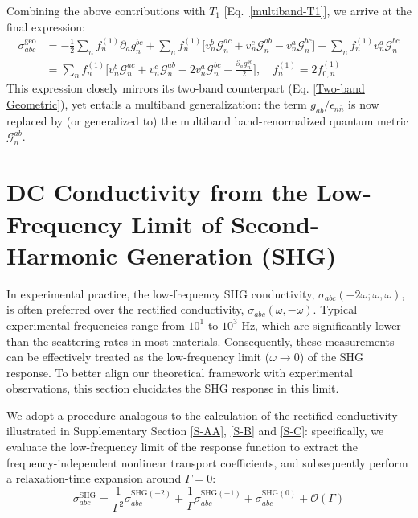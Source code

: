 \documentclass[twocolumn, prx, reprint, amsfonts, amsmath, amssymb, longbibliography, floatfix, aps]{revtex4-2}
\begin{document}
Combining the above contributions with $T_1$ [Eq.~\eqref{multiband-T1}], we arrive at the final expression:
\begin{equation}
	\begin{aligned}
		\sigma^{\text{geo}}_{abc} &= -\frac{1}{2} {\textstyle \sum_{n}}f^{(1)}_n \partial_{a}g^{bc}_n  + {\textstyle \sum_{n}} f^{(1)}_n \Big[v^b_{n} \mathcal{G}^{ac}_{n}  + v^c_{n} \mathcal{G}^{ab}_{n} - v^a_{n} \mathcal{G}^{bc}_{n} \Big] -{\textstyle \sum_{n}} f^{(1)}_{n} v^a_{n} \mathcal{G}^{bc}_n \\
		&= {\textstyle \sum_{n}} f^{(1)}_n \Big[v^b_{n} \mathcal{G}^{ac}_{n}  + v^c_{n} \mathcal{G}^{ab}_{n} - 2v^a_{n} \mathcal{G}^{bc}_{n}  - \frac{\partial_a g^{bc}_n}{2}\Big],
        \quad
        f_n^{(1)} = 2 f_{0,n}^{(1)}
	\end{aligned}
\end{equation}
This expression closely mirrors its two-band counterpart (Eq. \ref{Two-band Geometric}), yet entails a multiband generalization: the term $g_{ab}/\epsilon_{n\bar{n}}$ is now replaced by (or generalized to) the multiband band-renormalized quantum metric $\mathcal{G}^{ab}_n$.










\section{DC Conductivity from the Low-Frequency Limit of Second-Harmonic Generation (SHG)}
In experimental practice, the low-frequency SHG conductivity, $\sigma_{abc}(-2\omega; \omega, \omega)$, is often preferred over the rectified conductivity, $\sigma_{abc}(\omega, -\omega)$. Typical experimental frequencies range from $10^1$ to $10^3$ Hz, which are significantly lower than the scattering rates in most materials. Consequently, these measurements can be effectively treated as the low-frequency limit ($\omega \rightarrow 0$) of the SHG response. To better align our theoretical framework with experimental observations, this section elucidates the SHG response in this limit.

We adopt a procedure analogous to the calculation of the rectified conductivity illustrated in Supplementary Section \ref{S-AA}, \ref{S-B} and \ref{S-C}: specifically, we evaluate the low-frequency limit of the response function to extract the frequency-independent nonlinear transport coefficients, and subsequently perform a relaxation-time expansion around $\Gamma = 0$:
\begin{equation}
	\sigma_{abc}^{\text{SHG}} = \frac{1}{\Gamma^2}\sigma_{abc}^{\text{SHG}(-2)} + \frac{1}{\Gamma}\sigma_{abc}^{\text{SHG}(-1)} + \sigma_{abc}^{\text{SHG}(0)} + \mathcal{O}(\Gamma)
\end{equation}
\end{document}
